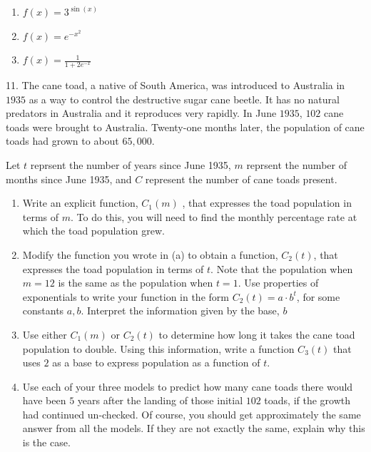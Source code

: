 \documentclass[10pt,]{book}
\theoremstyle{plain}
\theoremstyle{definition}
\theoremstyle{definition}
\theoremstyle{definition}
\numberwithin{equation}{section}
\begin{document}
\begin{exerciselist}
\begin{enumerate}[label=(\alph*)]
\item\hypertarget{li-163}{}\(f(x)=3^{\sin(x)}\)%
\item\hypertarget{li-164}{}\(f(x)=e^{-x^2}\)%
\item\hypertarget{li-165}{}\(f(x)=\frac{1}{1+2e^{-x}}\)%
\end{enumerate}
\par\smallskip
\item[11.]\hypertarget{exercise-72}{}\hypertarget{p-270}{}%
The cane toad, a native of South America, was introduced to Australia in \(1935\) as a way to control the destructive sugar cane beetle.  It has no natural predators in Australia and it reproduces very rapidly.  In June \(1935\), \(102\) cane toads were brought to Australia.  Twenty-one months later, the population of cane toads had grown to about \(65,000\).%
\par
\hypertarget{p-271}{}%
Let \(t\) reprsent the number of years since June 1935, \(m\) reprsent the number of months since June 1935, and \(C\) represent the number of cane toads present.%
\leavevmode%
\begin{enumerate}[label=(\alph*)]
\item\hypertarget{li-166}{}Write an explicit function, \(C_1(m)\) , that expresses the toad population in terms of \(m\). To do this, you will need to find the monthly percentage rate at which the toad population grew.%
\item\hypertarget{li-167}{}Modify the function you wrote in (a) to obtain a function,  \(C_2(t)\), that expresses the toad population in terms of \(t\). Note that the population when \(m = 12\) is the same as the population when \(t = 1\).  Use properties of exponentials to write your function in the form \(C_2(t)=a \cdot b^t\), for some constants \(a, b\).  Interpret the information given by the base, \(b\)%
\item\hypertarget{li-168}{}Use either  \(C_1(m)\)  or \(C_2(t)\) to determine how long it takes the cane toad population to double.  Using this information, write a function \(C_3(t)\) that uses \(2\) as a base to express population as a function of \(t\).%
\item\hypertarget{li-169}{}Use each of your three models to predict how many cane toads there would have been \(5\) years after the landing of those initial \(102\) toads, if the growth had continued un-checked.  Of course, you should get approximately the same answer from all the models.  If they are not exactly the same, explain why this is the case.%

\end{enumerate}
\end{exerciselist}
\end{document}
